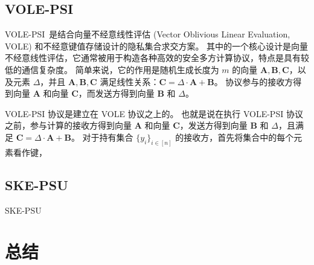 
\subsection{VOLE-PSI}

VOLE-PSI~\cite{rindal2021volepsi}是结合向量不经意线性评估 (Vector Oblivious Linear Evaluation, VOLE) 和不经意键值存储设计的隐私集合求交方案。
其中的一个核心设计是向量不经意线性评估，它通常被用于构造各种高效的安全多方计算协议，特点是具有较低的通信复杂度。
简单来说，它的作用是随机生成长度为 $m$ 的向量 $\mathbf{A}, \mathbf{B}, \mathbf{C}$，以及元素 $\Delta$，并且 $\mathbf{A}, \mathbf{B}, \mathbf{C}$ 满足线性关系：$\mathbf{C} = \Delta \cdot \mathbf{A} + \mathbf{B}$。
协议参与的接收方得到向量 $\mathbf{A}$ 和向量 $\mathbf{C}$，而发送方得到向量 $\mathbf{B}$ 和 $\Delta$。

VOLE-PSI 协议是建立在 VOLE 协议之上的。
也就是说在执行 VOLE-PSI 协议之前，参与计算的接收方得到向量 $\mathbf{A}$ 和向量 $\mathbf{C}$，发送方得到向量 $\mathbf{B}$ 和 $\Delta$，且满足 $\mathbf{C} = \Delta \cdot \mathbf{A} + \mathbf{B}$。
对于持有集合 $\{y_i\}_{i\in [n]}$ 的接收方，首先将集合中的每个元素看作键，






\newpage
\subsection{SKE-PSU}

SKE-PSU~\cite{zhang2023linear}

\section{总结}
